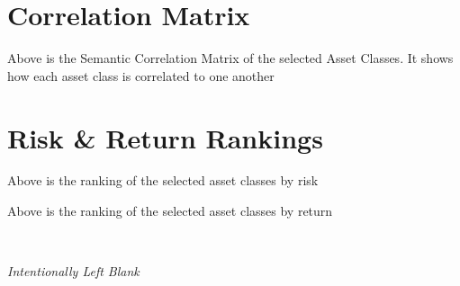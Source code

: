 \documentclass{article}
\begin{document}
\begin{landscape}

\section{Correlation Matrix}

\vspace{1cm}

\begin{center}


\scriptsize
\vspace{0.3cm}

    Above is the Semantic Correlation Matrix of the selected Asset Classes. It shows how each asset class is correlated to one another

\end{center}


\vspace{1cm}

\newpage  %

\section{Risk \& Return Rankings}

\vspace{2cm}

\begin{center}

\vspace{0.3cm}

    Above is the ranking of the selected asset classes by risk

\end{center}

\vspace{1cm}


\begin{center}

    \vspace{0.3cm}

    Above is the ranking of the selected asset classes by return

\end{center}

\end{landscape}
\newpage
\begin{center}
{\scshape\Large\bfseries \, \par}
	\vspace{10cm}
\emph{Intentionally Left Blank}

\end{center}
\end{document}
